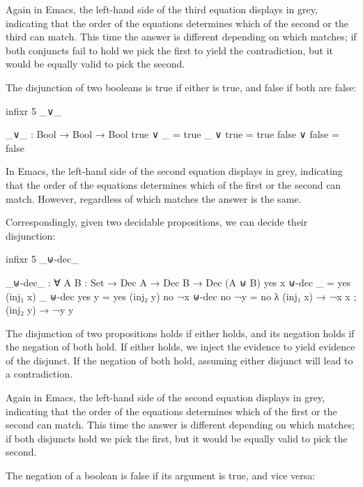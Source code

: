 Again in Emacs, the left-hand side of the third equation displays in
grey, indicating that the order of the equations determines which of the
second or the third can match. This time the answer is different
depending on which matches; if both conjuncts fail to hold we pick the
first to yield the contradiction, but it would be equally valid to pick
the second.

The disjunction of two booleans is true if either is true, and false if
both are false:

\begin{fence}
\begin{code}
infixr 5 _∨_

_∨_ : Bool → Bool → Bool
true  ∨ _      = true
_     ∨ true   = true
false ∨ false  = false
\end{code}
\end{fence}

In Emacs, the left-hand side of the second equation displays in grey,
indicating that the order of the equations determines which of the first
or the second can match. However, regardless of which matches the answer
is the same.

Correspondingly, given two decidable propositions, we can decide their
disjunction:

\begin{fence}
\begin{code}
infixr 5 _⊎-dec_

_⊎-dec_ : ∀ {A B : Set} → Dec A → Dec B → Dec (A ⊎ B)
yes x ⊎-dec _     = yes (inj₁ x)
_     ⊎-dec yes y = yes (inj₂ y)
no ¬x ⊎-dec no ¬y = no λ{ (inj₁ x) → ¬x x ; (inj₂ y) → ¬y y }
\end{code}
\end{fence}

The disjunction of two propositions holds if either holds, and its
negation holds if the negation of both hold. If either holds, we inject
the evidence to yield evidence of the disjunct. If the negation of both
hold, assuming either disjunct will lead to a contradiction.

Again in Emacs, the left-hand side of the second equation displays in
grey, indicating that the order of the equations determines which of the
first or the second can match. This time the answer is different
depending on which matches; if both disjuncts hold we pick the first,
but it would be equally valid to pick the second.

The negation of a boolean is false if its argument is true, and vice
versa:

